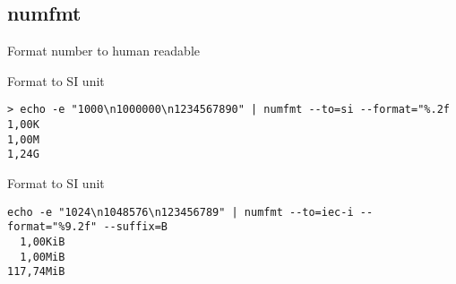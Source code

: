 \subsection{numfmt}

\begin{frame}[fragile]{Format number to human readable}
  \begin{exampleblock}{Format to SI unit}
    \begin{lstlisting}[showstringspaces=false,basicstyle=\tiny]
> echo -e "1000\n1000000\n1234567890" | numfmt --to=si --format="%.2f
1,00K
1,00M
1,24G
    \end{lstlisting}
  \end{exampleblock}
\pause
  \begin{exampleblock}{Format to SI unit}
    \begin{lstlisting}[showstringspaces=false,basicstyle=\tiny]
echo -e "1024\n1048576\n123456789" | numfmt --to=iec-i --format="%9.2f" --suffix=B
  1,00KiB
  1,00MiB
117,74MiB
    \end{lstlisting}
  \end{exampleblock}
\end{frame}

